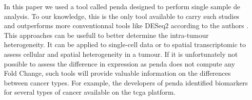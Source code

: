 In this paper we used a tool called \acrfull{penda} designed to perform single sample \acrlong{de} analysis.
To our knowledge, this is the only tool available to carry such studies and outperforms more conventionnal tools like DESeq2 according to the authors \cite*{Richard2020}.
This approaches can be usefull to better determine the intra-tumour heterogeneity.
It can be applied to single-cell data or to spatial transcriptomic to assess cellular and spatial heterogeneity in a tumour.
If it is unfortunately not possible to assess the difference in expression as \acrshort{penda} does not compute any Fold Change, such tools will provide valuable information on the differences between cancer types.
For example, the developers of \acrshort{penda} identified biomarkers for several types of cancer available on the \acrshort{tcga} platform.